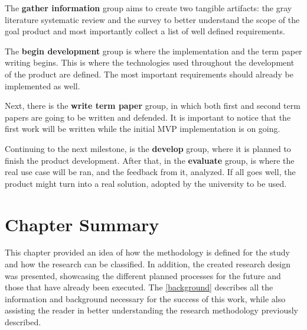 The \textbf{gather information} group aims to create two tangible artifacts: the gray literature systematic review and the survey to better understand the scope of the goal product and most importantly collect a list of well defined requirements.

The \textbf{begin development} group is where the implementation and the term paper writing begins. This is where the technologies used throughout the development of the product are defined. The most important requirements should already be implemented as well.

Next, there is the \textbf{write term paper} group, in which both first and second term papers are going to be written and defended. It is important to notice that the first work will be written while the initial \ac{MVP} implementation is on going.

Continuing to the next milestone, is the \textbf{develop} group, where it is planned to finish the product development. After that, in the \textbf{evaluate} group, is where the real use case will be ran, and the feedback from it, analyzed. If all goes well, the product might turn into a real solution, adopted by the university to be used.

\section{Chapter Summary}\label{sec:met-4}

This chapter provided an idea of how the methodology is defined for the study and how the research can be classified. In addition, the created research design was presented, showcasing the different planned processes for the future and those that have already been executed. The \autoref{background} describes all the information and background necessary for the success of this work, while also assisting the reader in better understanding the research methodology previously described.




